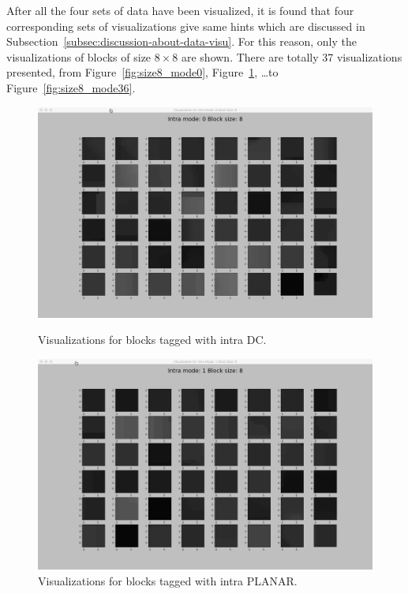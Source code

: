 After all the four sets of data have been visualized,
it is found that four corresponding sets of visualizations
give same hints which are discussed in
Subsection~\ref{subsec:discussion-about-data-visu}.
For this reason, only the visualizations of blocks of size \(8\times8\)
are shown.
There are totally 37 visualizations presented,
from Figure~\ref{fig:size8_mode0}, Figure~\ref{fig:size8_mode1},
\ldots to Figure~\ref{fig:size8_mode36}.

\begin{figure}[H]
    
        \vspace*{1cm} %
    
        \begin{minipage}{0.49\textwidth}
            \includegraphics[width=\linewidth]{Figures/visu-size8x8/8-0}
            \caption[Visualizations for blocks tagged with intra DC]{Visualizations for blocks tagged with intra DC.}
            \label{fig:size8_mode0}
        \end{minipage}
        \hspace{\fill} %
        \begin{minipage}{0.49\textwidth}
            \includegraphics[width=\linewidth]{Figures/visu-size8x8/8-1}
            \caption[Visualizations for blocks tagged with intra PLANAR]{Visualizations for blocks tagged with intra PLANAR.}
            \label{fig:size8_mode1}
        \end{minipage}
        

\end{figure}
